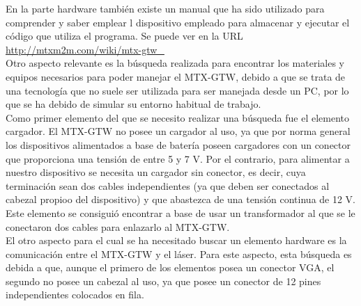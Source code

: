 En la parte hardware también existe un manual que ha sido utilizado para comprender y saber emplear l dispositivo empleado para almacenar y ejecutar el código que utiliza el programa. Se puede ver en la URL \url{ http://mtxm2m.com/wiki/mtx-gtw_}\\
Otro aspecto relevante es la búsqueda realizada para encontrar los materiales y equipos necesarios para poder manejar el MTX-GTW, debido a que se trata de una tecnología que no suele ser utilizada para ser manejada desde un PC, por lo que se ha debido de simular su entorno habitual de trabajo.\\
Como primer elemento del que se necesito realizar una búsqueda fue el elemento cargador. El MTX-GTW no posee un cargador al uso, ya que por norma general los dispositivos alimentados a base  de batería poseen cargadores con un conector que proporciona una tensión de entre 5 y 7 V. Por el contrario, para alimentar a nuestro dispositivo se necesita un cargador sin conector, es decir, cuya terminación sean dos cables independientes (ya que deben ser conectados al cabezal propioo del dispositivo) y que abastezca de una tensión continua de 12 V. Este elemento se consiguió encontrar a base de usar un transformador al que se le conectaron dos cables para enlazarlo al MTX-GTW.\\
El otro aspecto para el cual se ha necesitado buscar un elemento hardware es la comunicación entre el MTX-GTW y el láser. Para este aspecto, esta búsqueda es debida a que, aunque el primero de los elementos posea un conector VGA, el segundo no posee un cabezal al uso, ya que posee un conector de 12 pines independientes colocados en fila.